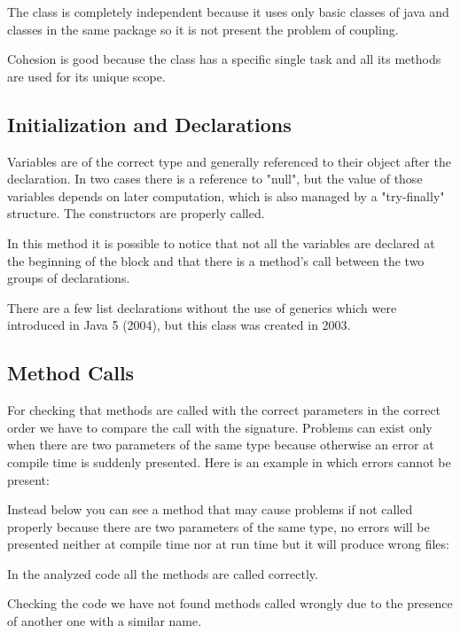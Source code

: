 \documentclass[a4paper]{article}
\begin{document}
The class is completely independent because it uses only basic classes of java and classes in the same package so it is not present the problem of coupling.

Cohesion is good because the class has a specific single task and all its methods are used for its unique scope.

\subsection{Initialization and Declarations}
Variables are of the correct type and generally referenced to their object after the declaration. 
In two cases there is a reference to "null", but the value of those variables depends on later computation, which is also managed by a "try-finally" structure. The constructors are properly called.


In this method it is possible to notice that not all the variables are declared at the beginning of the block and that there is a method's call between the two groups of declarations.

There are a few list declarations without the use of generics which were introduced in Java 5 (2004), but this class was created in 2003.


\subsection{Method Calls}

For checking that methods are called with the correct parameters in the correct order we have to compare the call with the signature. Problems can exist only when there are two parameters of the same type because otherwise an error at compile time is suddenly presented. \newline
Here is an example in which errors cannot be present: 

Instead below you can see a method that may cause problems if not called properly because there are two parameters of the same type, no errors will be presented neither at compile time nor at run time but it will produce wrong files:

In the analyzed code all the methods are called correctly.

Checking the code we have not found methods called wrongly due to the presence of another one with a similar name.
\end{document}
